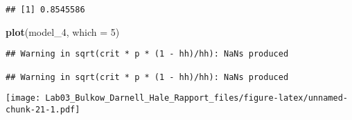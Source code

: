 \documentclass[]{article}
\newenvironment{Shaded}{\begin{snugshade}}{\end{snugshade}}
\newcommand{\KeywordTok}[1]{\textcolor[rgb]{0.13,0.29,0.53}{\textbf{#1}}}
\newcommand{\DataTypeTok}[1]{\textcolor[rgb]{0.13,0.29,0.53}{#1}}
\newcommand{\DecValTok}[1]{\textcolor[rgb]{0.00,0.00,0.81}{#1}}
\newcommand{\StringTok}[1]{\textcolor[rgb]{0.31,0.60,0.02}{#1}}
\newcommand{\CommentTok}[1]{\textcolor[rgb]{0.56,0.35,0.01}{\textit{#1}}}
\newcommand{\OperatorTok}[1]{\textcolor[rgb]{0.81,0.36,0.00}{\textbf{#1}}}
\newcommand{\NormalTok}[1]{#1}
\begin{document}
\begin{Shaded}
\end{Shaded}

\begin{verbatim}
## [1] 0.8545586
\end{verbatim}

\begin{Shaded}
\begin{Highlighting}[]
\KeywordTok{plot}\NormalTok{(model_}\DecValTok{4}\NormalTok{, }\DataTypeTok{which =} \DecValTok{5}\NormalTok{)}
\end{Highlighting}
\end{Shaded}

\begin{verbatim}
## Warning in sqrt(crit * p * (1 - hh)/hh): NaNs produced

## Warning in sqrt(crit * p * (1 - hh)/hh): NaNs produced
\end{verbatim}

\texttt{[image: Lab03\_Bulkow\_Darnell\_Hale\_Rapport\_files/figure-latex/unnamed-chunk-21-1.pdf]}
\end{document}
